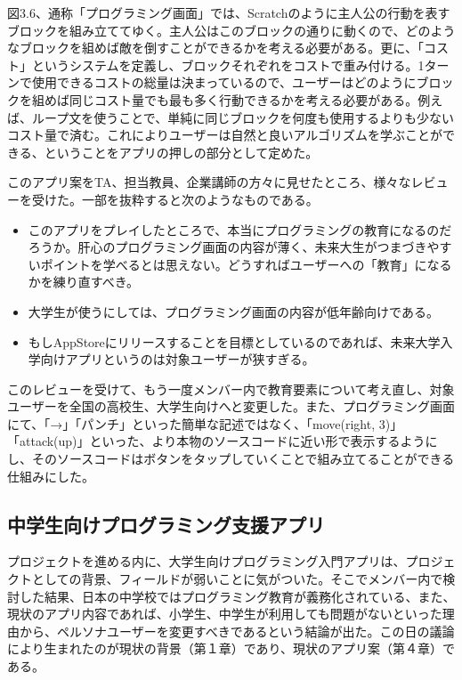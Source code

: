 \documentclass[openany,11pt,papersize]{jsbook}
\begin{document}
\par 図3.6、通称「プログラミング画面」では、Scratchのように主人公の行動を表すブロックを組み立ててゆく。主人公はこのブロックの通りに動くので、どのようなブロックを組めば敵を倒すことができるかを考える必要がある。更に、「コスト」というシステムを定義し、ブロックそれぞれをコストで重み付ける。1ターンで使用できるコストの総量は決まっているので、ユーザーはどのようにブロックを組めば同じコスト量でも最も多く行動できるかを考える必要がある。例えば、ループ文を使うことで、単純に同じブロックを何度も使用するよりも少ないコスト量で済む。これによりユーザーは自然と良いアルゴリズムを学ぶことができる、ということをアプリの押しの部分として定めた。
\par このアプリ案をTA、担当教員、企業講師の方々に見せたところ、様々なレビューを受けた。一部を抜粋すると次のようなものである。
\begin{itemize}
 \item このアプリをプレイしたところで、本当にプログラミングの教育になるのだろうか。肝心のプログラミング画面の内容が薄く、未来大生がつまづきやすいポイントを学べるとは思えない。どうすればユーザーへの「教育」になるかを練り直すべき。
 \item 大学生が使うにしては、プログラミング画面の内容が低年齢向けである。
 \item もしAppStoreにリリースすることを目標としているのであれば、未来大学入学向けアプリというのは対象ユーザーが狭すぎる。
 \end{itemize}
\par このレビューを受けて、もう一度メンバー内で教育要素について考え直し、対象ユーザーを全国の高校生、大学生向けへと変更した。また、プログラミング画面にて、「→」「パンチ」といった簡単な記述ではなく、「move(right, 3)」「attack(up)」といった、より本物のソースコードに近い形で表示するようにし、そのソースコードはボタンをタップしていくことで組み立てることができる仕組みにした。
 
 \subsection{中学生向けプログラミング支援アプリ}
\par プロジェクトを進める内に、大学生向けプログラミング入門アプリは、プロジェクトとしての背景、フィールドが弱いことに気がついた。そこでメンバー内で検討した結果、日本の中学校ではプログラミング教育が義務化されている、また、現状のアプリ内容であれば、小学生、中学生が利用しても問題がないといった理由から、ペルソナユーザーを変更すべきであるという結論が出た。この日の議論により生まれたのが現状の背景（第１章）であり、現状のアプリ案（第４章）である。
\end{document}
